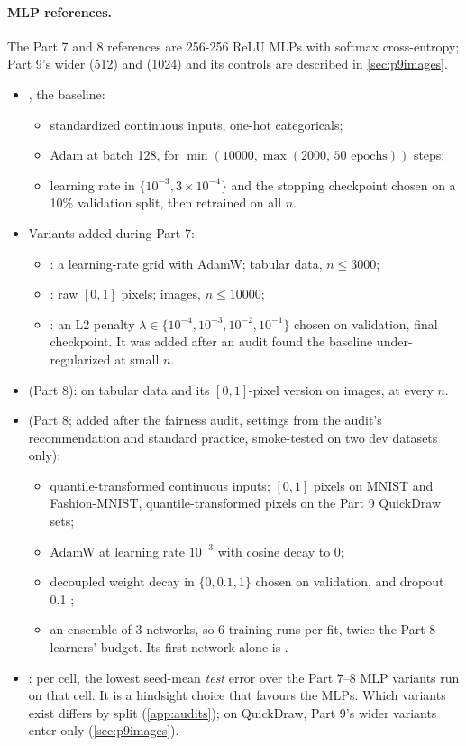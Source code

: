 \paragraph{MLP references.} The Part 7 and 8 references are 256-256 ReLU MLPs with softmax cross-entropy; Part 9's wider  (512) and  (1024) and its controls are described in \cref{sec:p9images}.
\begin{itemize}
\item {}, the baseline:
  \begin{itemize}
  \item standardized continuous inputs, one-hot categoricals;
  \item Adam at batch 128, for $\min(10000,\max(2000,\,50\text{ epochs}))$ steps;
  \item learning rate in $\{10^{-3},3\times10^{-4}\}$ and the stopping checkpoint chosen on a 10\% validation split, then retrained on all $n$.
  \end{itemize}
\item Variants added during Part 7:
  \begin{itemize}
  \item {}: a learning-rate grid with AdamW; tabular data, $n\le3000$;
  \item {}: raw $[0,1]$ pixels; images, $n\le10000$;
  \item {}: an L2 penalty $\lambda\in\{10^{-4},10^{-3},10^{-2},10^{-1}\}$ chosen on validation, final checkpoint. It was added after an audit found the baseline under-regularized at small $n$.
  \end{itemize}
\item {} (Part 8):  on tabular data and its $[0,1]$-pixel version  on images, at every $n$.
\item {} (Part 8; added after the fairness audit, settings from the audit's recommendation and standard practice, smoke-tested on two dev datasets only):
  \begin{itemize}
  \item quantile-transformed continuous inputs; $[0,1]$ pixels on MNIST and Fashion-MNIST, quantile-transformed pixels on the Part 9 QuickDraw sets;
  \item AdamW \cite{loshchilov2019adamw} at learning rate $10^{-3}$ with cosine decay to 0;
  \item decoupled weight decay in $\{0,0.1,1\}$ chosen on validation, and dropout 0.1 \cite{srivastava2014dropout};
  \item an ensemble of 3 networks, so 6 training runs per fit, twice the Part 8 learners' budget. Its first network alone is .
  \end{itemize}
\item {}: per cell, the lowest seed-mean \emph{test} error over the Part 7--8 MLP variants run on that cell. It is a hindsight choice that favours the MLPs. Which variants exist differs by split (\cref{app:audits}); on QuickDraw, Part 9's wider variants enter only  (\cref{sec:p9images}).
\end{itemize}
